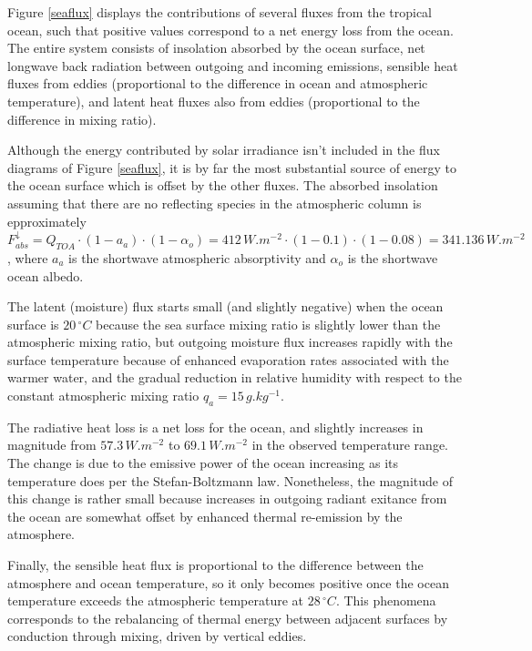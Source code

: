\documentclass[12pt]{article}
\begin{document}
Figure \ref{seaflux} displays the contributions of several fluxes from the tropical ocean, such that positive values correspond to a net energy loss from the ocean. The entire system consists of insolation absorbed by the ocean surface, net longwave back radiation between outgoing and incoming emissions, sensible heat fluxes from eddies (proportional to the difference in ocean and atmospheric temperature), and latent heat fluxes also from eddies (proportional to the difference in mixing ratio).

Although the energy contributed by solar irradiance isn't included in the flux diagrams of Figure \ref{seaflux}, it is by far the most substantial source of energy to the ocean surface which is offset by the other fluxes. The absorbed insolation assuming that there are no reflecting species in the atmospheric column is epproximately $F^\downarrow_{abs} = Q_{TOA} \cdot (1-a_{a}) \cdot (1-\alpha_o) = 412\,\si{W.m^{-2}} \cdot (1-0.1) \cdot (1-0.08) = 341.136\,\si{W.m^{-2}}$, where $a_a$ is the shortwave atmospheric absorptivity and $\alpha_o$ is the shortwave ocean albedo.

The latent (moisture) flux starts small (and slightly negative) when the ocean surface is $20\,\si{^\circ C}$ because the sea surface mixing ratio is slightly lower than the atmospheric mixing ratio, but outgoing moisture flux increases rapidly with the surface temperature because of enhanced evaporation rates associated with the warmer water, and the gradual reduction in relative humidity with respect to the constant atmospheric mixing ratio $q_a=15\,\si{g.kg^{-1}}$.

The radiative heat loss is a net loss for the ocean, and slightly increases in magnitude from $57.3\,\si{W.m^{-2}}$ to $69.1\,\si{W.m^{-2}}$ in the observed temperature range. The change is due to the emissive power of the ocean increasing as its temperature does per the Stefan-Boltzmann law. Nonetheless, the magnitude of this change is rather small because increases in outgoing radiant exitance from the ocean are somewhat offset by enhanced thermal re-emission by the atmosphere.

Finally, the sensible heat flux is proportional to the difference between the atmosphere and ocean temperature, so it only becomes positive once the ocean temperature exceeds the atmospheric temperature at $28\,\si{^\circ C}$. This phenomena corresponds to the rebalancing of thermal energy between adjacent surfaces by conduction through mixing, driven by vertical eddies.
\end{document}
